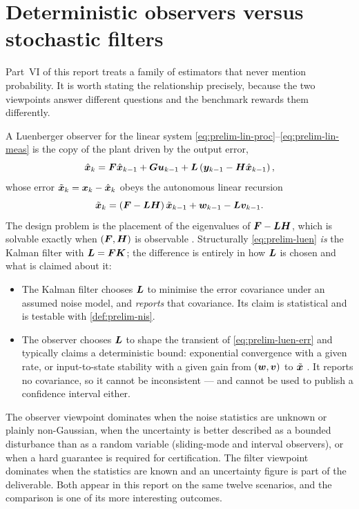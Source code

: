 \section{Deterministic observers versus stochastic filters}
\label{sec:prelim-observers}

Part~VI of this report treats a family of estimators that never mention probability. It is worth
stating the relationship precisely, because the two viewpoints answer different questions and
the benchmark rewards them differently.

A Luenberger observer \cite{luenberger1964,luenberger1971} for the linear system
\eqref{eq:prelim-lin-proc}--\eqref{eq:prelim-lin-meas} is the copy of the plant driven by the
output error,
\begin{equation}
\hat{\bm{x}}_k = \bm{F}\hat{\bm{x}}_{k-1} + \bm{G}\bm{u}_{k-1} + \bm{L}\left(\bm{y}_{k-1} - \bm{H}\hat{\bm{x}}_{k-1}\right),
\label{eq:prelim-luen}
\end{equation}
whose error $\tilde{\bm{x}}_k = \bm{x}_k-\hat{\bm{x}}_k$ obeys the autonomous linear recursion
\begin{equation}
\tilde{\bm{x}}_k = (\bm{F} - \bm{L}\bm{H})\,\tilde{\bm{x}}_{k-1} + \bm{w}_{k-1} - \bm{L}\bm{v}_{k-1}.
\label{eq:prelim-luen-err}
\end{equation}
The design problem is the placement of the eigenvalues of $\bm{F}-\bm{L}\bm{H}$, which is solvable exactly
when $(\bm{F},\bm{H})$ is observable \cite{ackermann1972}. Structurally
\eqref{eq:prelim-luen} \emph{is} the Kalman filter with $\bm{L} = \bm{F}\bm{K}$; the difference is
entirely in how $\bm{L}$ is chosen and what is claimed about it:
\begin{itemize}[nosep,leftmargin=*]
\item The Kalman filter chooses $\bm{L}$ to minimise the error covariance under an assumed noise
  model, and \emph{reports} that covariance. Its claim is statistical and is testable with
  \cref{def:prelim-nis}.
\item The observer chooses $\bm{L}$ to shape the transient of \eqref{eq:prelim-luen-err} and
  typically claims a deterministic bound: exponential convergence with a given rate, or
  input-to-state stability with a given gain from $(\bm{w},\bm{v})$ to $\tilde{\bm{x}}$
  \cite{khalil2002}. It reports no covariance, so it cannot be inconsistent --- and cannot be
  used to publish a confidence interval either.
\end{itemize}
The observer viewpoint dominates when the noise statistics are unknown or plainly non-Gaussian,
when the uncertainty is better described as a bounded disturbance than as a random variable
(sliding-mode and interval observers), or when a hard guarantee is required for certification.
The filter viewpoint dominates when the statistics are known and an uncertainty figure is part of
the deliverable. Both appear in this report on the same twelve scenarios, and the comparison is
one of its more interesting outcomes.

